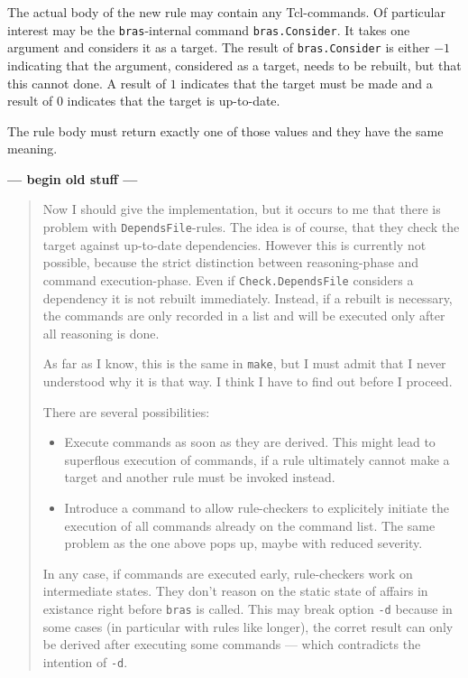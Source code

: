 \documentclass[12pt]{article}
\newcommand{\bras}{\texttt{bras}}
\newcommand{\make}{\texttt{make}}
\begin{document}
The actual body of the new rule may contain any Tcl-commands. Of
particular interest may be the \bras{}-internal command
\texttt{bras.Consider}. It takes one argument and considers it as a
target. The result of \texttt{bras.Consider} is either $-1$ indicating
that the argument, considered as a target, needs to be rebuilt, but
that this cannot done. A result of $1$ indicates that the target must
be made and a result of $0$ indicates that the target is up-to-date.

The rule body must return exactly one of those values and they have
the same meaning.

{\large\bfseries --- begin old stuff ---}
\begin{quote}\sffamily
Now I should give the implementation, but it occurs to me that there
is problem with \texttt{DependsFile}-rules. The idea is of course, that
they check the target against up-to-date dependencies. However this is
currently not possible, because the strict distinction between
reasoning-phase and command execution-phase. Even if
\texttt{Check.DependsFile} considers a dependency it is not rebuilt
immediately. Instead, if a rebuilt is necessary, the commands are only
recorded in a list and will be executed only after all reasoning is
done.

As far as I know, this is the same in \make{}, but I must admit that I
never understood why it is that way. I think I have to find out before
I proceed.

There are several possibilities:
\begin{itemize}
\item
Execute commands as soon as they are derived. This might lead to
superflous execution of commands, if a rule ultimately cannot make a
target and another rule must be invoked instead.
\item 
Introduce a command to allow rule-checkers to explicitely initiate the
execution of all commands already on the command list. The same
problem as the one above pops up, maybe with reduced severity.
\end{itemize}

In any case, if commands are executed early, rule-checkers work on
intermediate states. They don't reason on the static state of affairs
in existance right before \bras{} is called. This may break
option \texttt{-d} because in some cases (in particular with rules
like longer), the corret result can only be derived after executing
some commands --- which contradicts the intention of \texttt{-d}.
\end{quote}
\end{document}
